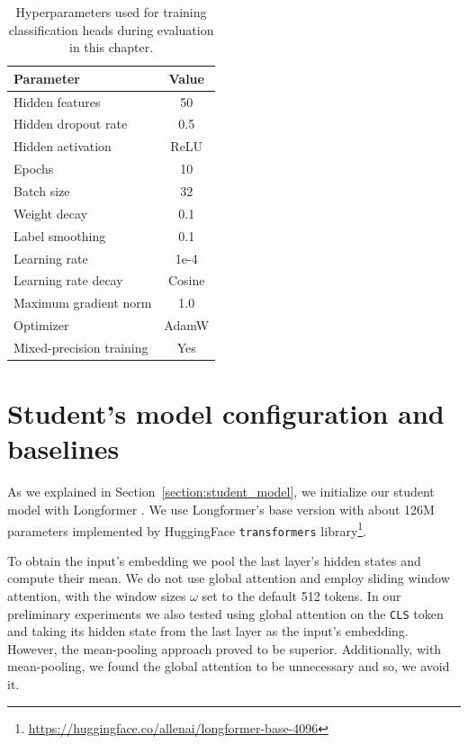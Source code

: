 \begin{table}
  \centering
  \footnotesize

  \begin{tabular}{l c}
    \toprule
    Parameter & Value \\
    \midrule
    Hidden features & 50 \\
    Hidden dropout rate & 0.5 \\
    Hidden activation & ReLU \\
    Epochs & 10 \\
    Batch size & 32 \\
    Weight decay & 0.1 \\
    Label smoothing & 0.1 \\
    Learning rate & 1e-4 \\
    Learning rate decay & Cosine \\
    Maximum gradient norm & 1.0 \\
    Optimizer & AdamW \\
    Mixed-precision training & Yes \\
    \bottomrule
  \end{tabular}

  \caption{Hyperparameters used for training classification heads during
  evaluation in this chapter.}

  \label{table:head_train_params}

\end{table}

\section{Student's model configuration and baselines}\label{section:student_model_config_baselines}

As we explained in Section~\ref{section:student_model}, we initialize our
student model with Longformer \citep{beltagy2020longformer}. We use
Longformer's base version with about 126M parameters implemented by HuggingFace
\texttt{transformers}
library\footnote{\url{https://huggingface.co/allenai/longformer-base-4096}}.

To obtain the input's embedding we pool the last layer's hidden states and
compute their mean. We do not use global attention and employ sliding window
attention, with the window sizes $\omega$ set to the default 512 tokens. In our
preliminary experiments we also tested using global attention on the
\texttt{CLS} token and taking its hidden state from the last layer as the
input's embedding. However, the mean-pooling approach proved to be superior.
Additionally, with mean-pooling, we found the global attention to be
unnecessary and so, we avoid it.

